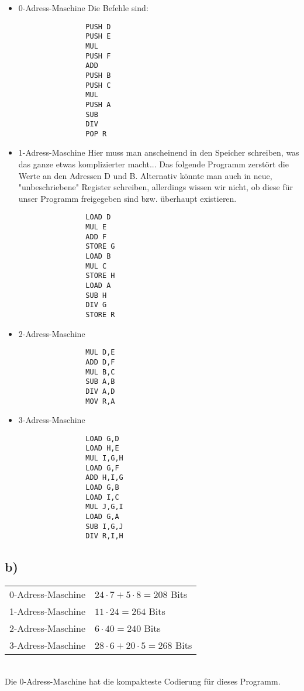 \documentclass{article}
\begin{document}
		\begin{itemize}
		\item 0-Adress-Maschine
			Die Befehle sind:
			\begin{verbatim}
				PUSH D
				PUSH E
				MUL
				PUSH F
				ADD
				PUSH B
				PUSH C
				MUL
				PUSH A
				SUB
				DIV
				POP R
			\end{verbatim}

		\item 1-Adress-Maschine
			Hier muss man anscheinend in den Speicher schreiben, was das ganze etwas komplizierter macht... Das folgende Programm zerstört die Werte an den Adressen D und B. Alternativ könnte man auch in neue, "unbeschriebene" Register schreiben, allerdings wissen wir nicht, ob diese für unser Programm freigegeben sind bzw. überhaupt existieren.
			\begin{verbatim}
				LOAD D
				MUL E
				ADD F
				STORE G
				LOAD B
				MUL C
				STORE H
				LOAD A
				SUB H
				DIV G
				STORE R
			\end{verbatim}

		\item 2-Adress-Maschine
			\begin{verbatim}
				MUL D,E
				ADD D,F
				MUL B,C
				SUB A,B
				DIV A,D
				MOV R,A
			\end{verbatim}

		\item 3-Adress-Maschine
			\begin{verbatim}
				LOAD G,D
				LOAD H,E
				MUL I,G,H
				LOAD G,F
				ADD H,I,G
				LOAD G,B
				LOAD I,C
				MUL J,G,I
				LOAD G,A
				SUB I,G,J
				DIV R,I,H
			\end{verbatim}
		\end{itemize}

	\subsection*{b)}
		\begin{tabular}{r | l}
			0-Adress-Maschine & $24\cdot7+5\cdot8 = 208$ Bits \\
			1-Adress-Maschine & $11\cdot24 = 264$ Bits \\
			2-Adress-Maschine & $6\cdot40 = 240$ Bits \\
			3-Adress-Maschine & $28\cdot6 + 20\cdot5 = 268$ Bits \\
		\end{tabular} \\

		Die 0-Adress-Maschine hat die kompakteste Codierung für dieses Programm.
\end{document}
